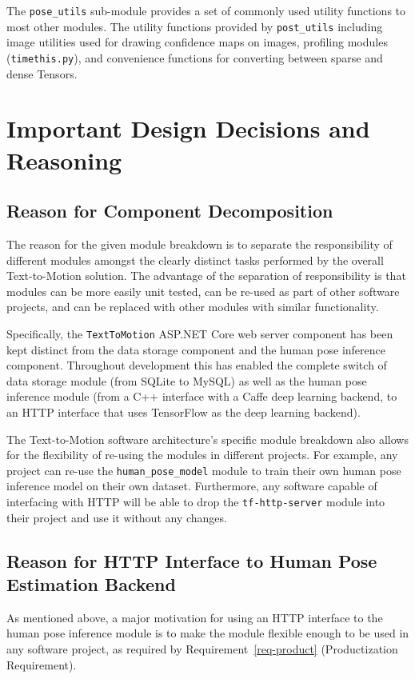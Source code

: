 \documentclass{scrreprt}
\begin{document}
The \verb|pose_utils| sub-module provides a set of commonly used utility
functions to most other modules. The utility functions provided by
\verb|post_utils| including image utilities used for drawing confidence maps on
images, profiling modules (\verb|timethis.py|), and convenience functions for
converting between sparse and dense Tensors.

\chapter{Important Design Decisions and Reasoning}

\section{Reason for Component Decomposition}

The reason for the given module breakdown is to separate the responsibility of
different modules amongst the clearly distinct tasks performed by the overall
Text-to-Motion solution. The advantage of the separation of responsibility is
that modules can be more easily unit tested, can be re-used as part of other
software projects, and can be replaced with other modules with similar
functionality.

Specifically, the \verb|TextToMotion| ASP.NET Core web server component has
been kept distinct from the data storage component and the human pose inference
component. Throughout development this has enabled the complete switch of data
storage module (from SQLite to MySQL) as well as the human pose inference
module (from a C++ interface with a Caffe deep learning backend, to an HTTP
interface that uses TensorFlow as the deep learning backend).

The Text-to-Motion software architecture's specific module breakdown also
allows for the flexibility of re-using the modules in different projects. For
example, any project can re-use the \verb|human_pose_model| module to train
their own human pose inference model on their own dataset. Furthermore, any
software capable of interfacing with HTTP will be able to drop the
\verb|tf-http-server| module into their project and use it without any changes.

\section{Reason for HTTP Interface to Human Pose Estimation Backend}

As mentioned above, a major motivation for using an HTTP interface to the human
pose inference module is to make the module flexible enough to be used in any
software project, as required by Requirement~\ref{req-product} (Productization
Requirement).
\end{document}
